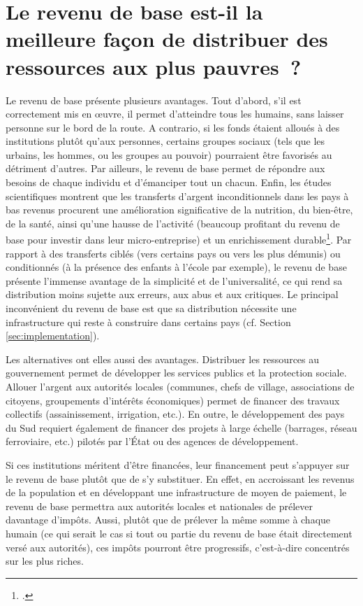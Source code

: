 \documentclass[a5paper,french,openany]{memoir}
\begin{document}
\section*{\normalsize Le revenu de base est-il la meilleure façon de distribuer des ressources aux plus pauvres~?}\label{q:rdb}

Le revenu de base présente plusieurs avantages. Tout d'abord, s'il est correctement mis en œuvre, il permet d'atteindre tous les humains, sans laisser personne sur le bord de la route. A contrario, si les fonds étaient alloués à des institutions plutôt qu'aux personnes, certains groupes sociaux (tels que les urbains, les hommes, ou les groupes au pouvoir) pourraient être favorisés au détriment d'autres. Par ailleurs, le revenu de base permet de répondre aux besoins de chaque individu et d'émanciper tout un chacun. Enfin, les études scientifiques montrent que les transferts d'argent inconditionnels dans les pays à bas revenus procurent une amélioration significative de la nutrition, du bien-être, de la santé, ainsi qu'une hausse de l'activité (beaucoup profitant du revenu de base pour investir dans leur micro-entreprise) et un enrichissement durable\footnote{\cite{haushofer_short-term_2016,egger_general_2022,standing_little_2014}.}. Par rapport à des transferts ciblés (vers certains pays ou vers les plus démunis) ou conditionnés (à la présence des enfants à l'école par exemple), le revenu de base présente l'immense avantage de la simplicité et de l'universalité, ce qui rend sa distribution moins sujette aux erreurs, aux abus et aux critiques. Le principal inconvénient du revenu de base est que sa distribution nécessite une infrastructure qui reste à construire dans certains pays (cf. Section \ref{sec:implementation}).  %

Les alternatives ont elles aussi des avantages. Distribuer les ressources au gouvernement permet de développer les services publics et la protection sociale. Allouer l'argent aux autorités locales (communes, chefs de village, associations de citoyens, groupements d'intérêts économiques) permet de financer des travaux collectifs (assainissement, irrigation, etc.). En outre, le développement des pays du Sud requiert également de financer des projets à large échelle (barrages, réseau ferroviaire, etc.) pilotés par l'État ou des agences de développement. 

Si ces institutions méritent d'être financées, leur financement peut s'appuyer sur 
le revenu de base plutôt que de s'y substituer. En effet, en accroissant les revenus de la population et en développant une infrastructure de moyen de paiement, le revenu de base permettra aux autorités locales et nationales de prélever davantage d'impôts. Aussi, plutôt que de prélever la même somme à chaque humain (ce qui serait le cas si tout ou partie du revenu de base était directement versé aux autorités), ces impôts pourront être progressifs, c'est-à-dire concentrés sur les plus riches. 
\end{document}
